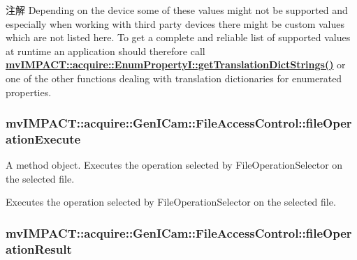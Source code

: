 \begin{DoxyNote}{注解}
Depending on the device some of these values might not be supported and especially when working with third party devices there might be custom values which are not listed here. To get a complete and reliable list of supported values at runtime an application should therefore call {\bfseries \hyperlink{classmv_i_m_p_a_c_t_1_1acquire_1_1_enum_property_i_a0ba6ccbf5ee69784d5d0b537924d26b6}{mv\+I\+M\+P\+A\+C\+T\+::acquire\+::\+Enum\+Property\+I\+::get\+Translation\+Dict\+Strings()}} or one of the other functions dealing with translation dictionaries for enumerated properties. 
\end{DoxyNote}
\hypertarget{classmv_i_m_p_a_c_t_1_1acquire_1_1_gen_i_cam_1_1_file_access_control_ae711a06491fa4bc8b5a707ce5a5135c4}{
\subsubsection[{file\+Operation\+Execute}]{ mv\+I\+M\+P\+A\+C\+T\+::acquire\+::\+Gen\+I\+Cam\+::\+File\+Access\+Control\+::file\+Operation\+Execute}}\label{classmv_i_m_p_a_c_t_1_1acquire_1_1_gen_i_cam_1_1_file_access_control_ae711a06491fa4bc8b5a707ce5a5135c4}


A method object. Executes the operation selected by File\+Operation\+Selector on the selected file. 

Executes the operation selected by File\+Operation\+Selector on the selected file. \hypertarget{classmv_i_m_p_a_c_t_1_1acquire_1_1_gen_i_cam_1_1_file_access_control_a97f3bb5c03a3f0b0ec3cece78e6548ae}{
\subsubsection[{file\+Operation\+Result}]{ mv\+I\+M\+P\+A\+C\+T\+::acquire\+::\+Gen\+I\+Cam\+::\+File\+Access\+Control\+::file\+Operation\+Result}}\label{classmv_i_m_p_a_c_t_1_1acquire_1_1_gen_i_cam_1_1_file_access_control_a97f3bb5c03a3f0b0ec3cece78e6548ae}


